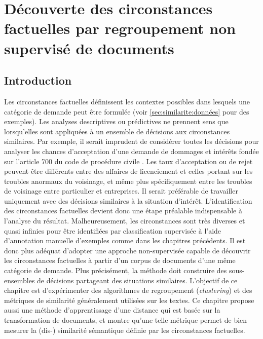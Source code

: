  \chapter{Découverte des circonstances factuelles par regroupement non supervisé de documents}
\label{chap:similarite}

\section{Introduction}
\label{sec:similarite:introduction}
Les circonstances factuelles définissent les contextes possibles dans lesquels une catégorie de demande peut être formulée (voir \ref{sec:similarite:données} pour des exemples). Les analyses descriptives ou prédictives ne prennent sens que lorsqu'elles sont appliquées à un ensemble de décisions aux circonstances similaires. Par exemple, il serait imprudent de considérer toutes les décisions pour analyser les chances d'acceptation d'une demande de dommages et intérêts fondée sur l'\og article 700 du code de procédure civile \fg{}. Les taux d'acceptation ou de rejet peuvent être différents entre des affaires de licenciement et celles portant sur les troubles anormaux du voisinage, et même plus spécifiquement entre les troubles de voisinage entre particulier et entreprises. %
 Il serait préférable de travailler uniquement avec des décisions similaires à la situation d'intérêt. L'identification des circonstances factuelles devient donc une étape préalable indispensable à l'analyse du résultat. Malheureusement, les circonstances sont très diverses et quasi infinies pour être identifiées par classification supervisée à l'aide d'annotation manuelle d'exemples comme dans les chapitres précédents. Il est donc plus adéquat d'adopter une approche non-supervisée capable de découvrir les circonstances factuelles à partir d'un corpus de documents d'une même catégorie de demande. Plus précisément, la méthode doit construire des sous-ensembles de décisions partageant des situations similaires.  L'objectif de ce chapitre est d'expérimenter des algorithmes  de regroupement (\textit{clustering}) et des métriques de similarité généralement utilisées sur les textes. Ce chapitre propose aussi une méthode d'apprentissage d'une distance qui est basée sur la transformation de documents, et montre qu'une telle métrique permet de bien mesurer la (dis-) similarité sémantique définie par les circonstances factuelles.

